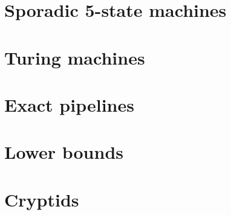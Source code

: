 \documentclass[a4paper,british]{article}
\theoremstyle{definition} %
\numberwithin{equation}{section}
\theoremstyle{definition} %
\begin{document}





% 





\section{Sporadic 5-state machines}\label{sec:sporadic}





\newpage


\appendix

\section{Turing machines}\label{app:TMs}
\section{Exact pipelines}\label{app:pipelines}
\section{Lower bounds}\label{app:lowerbounds}
\section{Cryptids}\label{app:cryptids}
\end{document}
